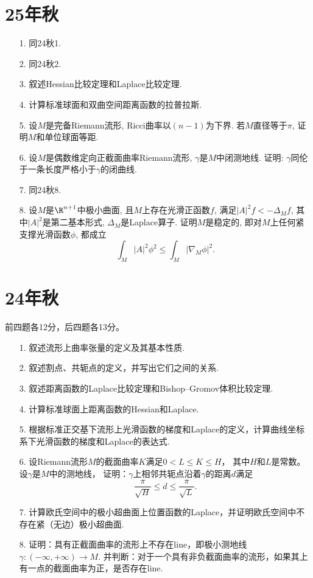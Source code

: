 \section{25年秋}
\begin{enumerate}
    \item[1.]同24秋1.
    \item[2.]同24秋2.
    \item[3.]叙述Hessian比较定理和Laplace比较定理.
    \item[4.]计算标准球面和双曲空间距离函数的拉普拉斯.
    \item[5.]设$M$是完备Riemann流形, Ricci曲率以$(n-1)$为下界. 若$M$直径等于$\pi$, 证明$M$和单位球面等距.
    \item[6.]设$M$是偶数维定向正截面曲率Riemann流形, $\gamma$是$M$中闭测地线. 证明: $\gamma$同伦于一条长度严格小于$\gamma$的闭曲线.
    \item[7.]同24秋8.
    \item[8.]设$M$是$\R^{n+1}$中极小曲面, 且$M$上存在光滑正函数$f$, 满足$|A|^2f<-\Delta_M f$, 其中$|A|^2$是第二基本形式, $\Delta_M$是Laplace算子. 证明$M$是稳定的, 即对$M$上任何紧支撑光滑函数$\phi$, 都成立
    $$\int_M |A|^2\phi^2\leq \int_M|\nabla_M\phi|^2 .$$
\end{enumerate}

\section{24年秋}
前四题各12分，后四题各13分。
\begin{enumerate}
    \item[1.]叙述流形上曲率张量的定义及其基本性质.
    \item[2.]叙述割点、共轭点的定义，并写出它们之间的关系.
    \item[3.]叙述距离函数的Laplace比较定理和Bishop--Gromov体积比较定理.
    \item[4.]计算标准球面上距离函数的Hessian和Laplace.
    \item[5.]根据标准正交基下流形上光滑函数的梯度和Laplace的定义，计算曲线坐标系下光滑函数的梯度和Laplace的表达式.
    \item[6.]设Riemann流形$M$的截面曲率$K$满足$0<L\le K\le H$，
    其中$H$和$L$是常数。设$\gamma$是$M$中的测地线，
    证明：$\gamma$上相邻共轭点沿着$\gamma$的距离$d$满足
    \[\frac{\pi}{\sqrt{H}}\le d \le\frac{\pi}{\sqrt{L}}.\]
    \item[7.]计算欧氏空间中的极小超曲面上位置函数的Laplace，并证明欧氏空间中不存在紧（无边）极小超曲面.
    \item[8.]证明：具有正截面曲率的流形上不存在line，即极小测地线$\gamma\colon (-\infty,+\infty)\rightarrow M$. 并判断：对于一个具有非负截面曲率的流形，如果其上有一点的截面曲率为正，是否存在line.
\end{enumerate}

